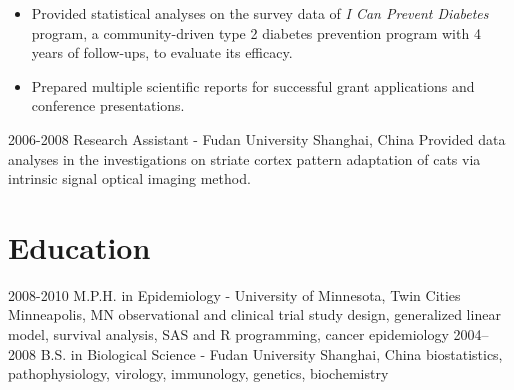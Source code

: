 \begin{entrylist}
{    %
    \begin{itemize}
      \item Provided statistical analyses on the survey data of \textit{I Can Prevent Diabetes} program, a community-driven type 2 diabetes prevention program with 4 years of follow-ups, to evaluate its efficacy.
      \item Prepared multiple scientific reports for successful grant applications and conference presentations.
    \end{itemize}
    }
  \entry
    {2006-2008}
    {Research Assistant - Fudan University}
    {Shanghai, China}
    {Provided data analyses in the investigations on striate cortex pattern adaptation of cats via intrinsic signal optical imaging method.}
\end{entrylist}

\section{Education}

\begin{entrylist}
  \entry
    {2008-2010}
    {M.P.H. in Epidemiology - University of Minnesota, Twin Cities}
    {Minneapolis, MN}
    {observational and clinical trial study design, generalized linear model, survival analysis, SAS and R programming, cancer epidemiology}
  \entry
    {2004–2008}
    {B.S. in Biological Science - Fudan University}
    {Shanghai, China}
    {biostatistics, pathophysiology, virology, immunology, genetics, biochemistry}
\end{entrylist}
